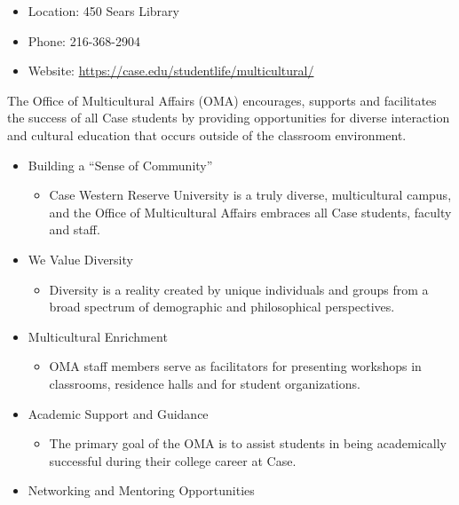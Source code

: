 \documentclass[
]{book}
\providecommand{\tightlist}{%
  \setlength{\itemsep}{0pt}\setlength{\parskip}{0pt}}
\begin{document}
\begin{itemize}
\tightlist
\item
  Location: 450 Sears Library
\item
  Phone: 216-368-2904
\item
  Website: \url{https://case.edu/studentlife/multicultural/}
\end{itemize}

The Office of Multicultural Affairs (OMA) encourages, supports and facilitates the success of all Case students by providing opportunities for diverse interaction and cultural education that occurs outside of the classroom environment.

\begin{itemize}
\tightlist
\item
  Building a ``Sense of Community''

  \begin{itemize}
  \tightlist
  \item
    Case Western Reserve University is a truly diverse, multicultural campus, and the Office of Multicultural Affairs embraces all Case students, faculty and staff.
  \end{itemize}
\item
  We Value Diversity

  \begin{itemize}
  \tightlist
  \item
    Diversity is a reality created by unique individuals and groups from a broad spectrum of demographic and philosophical perspectives.
  \end{itemize}
\item
  Multicultural Enrichment

  \begin{itemize}
  \tightlist
  \item
    OMA staff members serve as facilitators for presenting workshops in classrooms, residence halls and for student organizations.
  \end{itemize}
\item
  Academic Support and Guidance

  \begin{itemize}
  \tightlist
  \item
    The primary goal of the OMA is to assist students in being academically successful during their college career at Case.
  \end{itemize}
\item
  Networking and Mentoring Opportunities


\end{itemize}
\end{document}
